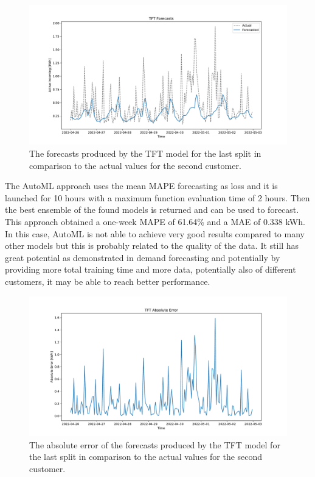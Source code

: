\begin{figure}[H]
\centering
\includegraphics[width=1\textwidth]{images/baseline/TFT}
\caption{The forecasts produced by the TFT model for the last split in comparison to the actual values for the second customer.}
\label{fig:baselinetfthourlyforecasts}
\end{figure}

The AutoML approach uses the mean MAPE forecasting as loss and it is launched for 10 hours with a maximum function evaluation time of 2 hours.
Then the best ensemble of the found models is returned and can be used to forecast.
This approach obtained a one-week MAPE of 61.64\% and a MAE of 0.338 kWh.
In this case, AutoML is not able to achieve very good results compared to many other models but this is probably related to the quality of the data.
It still has great potential as demonstrated in demand forecasting and potentially by providing more total training time and more data, potentially also of different customers, it may be able to reach better performance.

\begin{figure}[H]
\centering
\includegraphics[width=1\textwidth]{images/baseline/TFT_mae}
\caption{The absolute error of the forecasts produced by the TFT model for the last split in comparison to the actual values for the second customer.}
\label{fig:baselinetfthourlyforecastsmae}
\end{figure}

